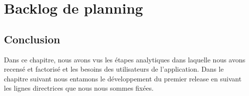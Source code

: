 \section{Backlog de planning}




\subsection{Conclusion}
Dans ce chapitre, nous avons vus les étapes analytiques dans laquelle nous avons recensé et
factorisé et les besoins des utilisateurs de l'application. Dans le chapitre suivant nous entamons
le développement du premier release en suivant les lignes directrices que nous nous sommes
fixées.


